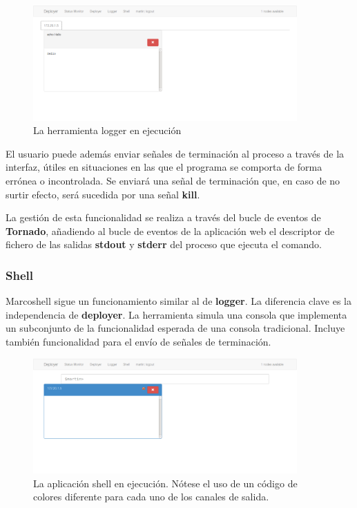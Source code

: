 \begin{figure}[H]
\centering
\includegraphics[width=0.9\textwidth]{Chapters/Chapter5/Figures/logger-deployer}
\caption[La herramienta logger en ejecución]{La herramienta logger en ejecución}
\end{figure}

El usuario puede además enviar señales de terminación al proceso a través de la interfaz, útiles en situaciones en las que el programa se comporta de forma errónea o incontrolada. Se enviará una señal de terminación que, en caso de no surtir efecto, será sucedida por una señal \textbf{kill}. 

La gestión de esta funcionalidad se realiza a través del bucle de eventos de \textbf{Tornado}, añadiendo al bucle de eventos de la aplicación web el descriptor de fichero de las salidas \textbf{stdout} y \textbf{stderr} del proceso que ejecuta el comando.

\subsubsection{Shell}

Marcoshell sigue un funcionamiento similar al de \textbf{logger}. La diferencia clave es la independencia de \textbf{deployer}. La herramienta simula una consola que implementa un subconjunto de la funcionalidad esperada de una consola tradicional. Incluye también funcionalidad para el envío de señales de terminación.

\begin{figure}[H]
\centering
\includegraphics[width=0.9\textwidth]{Chapters/Chapter5/Figures/logger-shell}
\caption[La aplicación shell en ejecución]{La aplicación shell en ejecución. Nótese el uso de un código de colores diferente para cada uno de los canales de salida.}
\end{figure}

